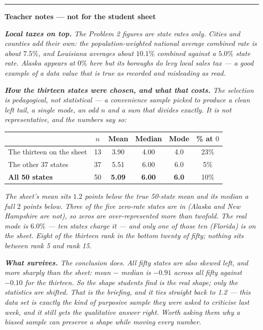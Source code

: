\documentclass[12pt, twoside]{article}
\begin{document}
\begin{enumerate}[itemsep=0.3cm]
\bigskip
\hrule
\bigskip

\textbf{Teacher notes --- not for the student sheet}

\emph{\textbf{Local taxes on top.} The Problem 2 figures are state rates only.
Cities and counties add their own: the population-weighted national average
combined rate is about $7.5\%$, and Louisiana averages about $10.1\%$ combined
against a $5.0\%$ state rate. Alaska appears at $0\%$ here but its boroughs do
levy local sales tax --- a good example of a data value that is true as recorded
and misleading as read.}

\emph{\textbf{How the thirteen states were chosen, and what that costs.} The
selection is pedagogical, not statistical --- a convenience sample picked to
produce a clean left tail, a single mode, an odd $n$ and a sum that divides
exactly. It is not representative, and the numbers say so:}

{\small
\begin{center}
\renewcommand{\arraystretch}{1.2}
\begin{tabular}{|l|c|c|c|c|c|}
\hline
 & $n$ & Mean & Median & Mode & \% at $0$ \\ \hline
The thirteen on the sheet & 13 & 3.90 & 4.00 & 4.0 & 23\% \\ \hline
The other 37 states       & 37 & 5.51 & 6.00 & 6.0 & 5\% \\ \hline
\textbf{All 50 states}    & 50 & \textbf{5.09} & \textbf{6.00} & \textbf{6.0} & 10\% \\ \hline
\end{tabular}
\end{center}}

\emph{The sheet's mean sits $1.2$ points below the true 50-state mean and its
median a full $2$ points below. Three of the five zero-rate states are in
(Alaska and New Hampshire are not), so zeros are over-represented more than
twofold. The real mode is $6.0\%$ --- ten states charge it --- and only one of
those ten (Florida) is on the sheet. Eight of the thirteen rank in the bottom
twenty of fifty; nothing sits between rank 5 and rank 15.}

\emph{\textbf{What survives.} The conclusion does. All fifty states are also
skewed left, and more sharply than the sheet: mean $-$ median is $-0.91$ across
all fifty against $-0.10$ for the thirteen. So the shape students find is the
real shape; only the statistics are shifted. That is the briefing, and it ties
straight back to 1.2 --- this data set is exactly the kind of purposive sample
they were asked to criticise last week, and it still gets the qualitative answer
right. Worth asking them why a biased sample can preserve a shape while moving
every number.}


\end{enumerate}
\end{document}
